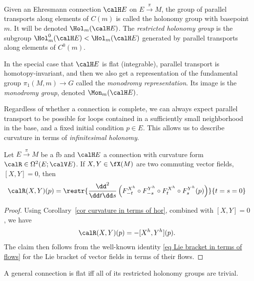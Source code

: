 \begin{defn}
    Given an Ehresmann connection $\calH E$ on $E\overset{\pi}{\to}M$, the group of parallel transports along elements of $C(m)$ is called the holonomy group  with basepoint $m$. It will be denoted $\Hol_m(\calH E)$. The \emph{restricted holonomy group} is the subgroup $\Hol^0_m(\calH E)<\Hol_m(\calH E)$ generated by parallel transports along elements of $C^0(m)$.
\end{defn}

\begin{defn}
    In the special case that $\calH E$ is flat (integrable), parallel transport is homotopy-invariant, and then we also get a representation of the fundamental group $\pi_1(M,m)\to G$ called the \emph{monodromy representation}. Its image is the \emph{monodromy group}, denoted $\Mon_m(\calH E)$.
\end{defn}

Regardless of whether a connection is complete, we can always expect parallel transport to be possible for loops contained in a sufficiently small neighborhood in the base, and a fixed initial condition $p\in E$. This allows us to describe curvature in terms of \emph{infinitesimal holonomy}.

\begin{prop}
    Let $E\overset{\pi}{\to}M$ be a \gls{fb} and $\calH E$ a connection with curvature form $\calR\in\Omega^2(E;\calV E)$. If $X,Y\in\fX(M)$ are two commuting vector fields, $[X,Y]=0$, then 
    \[\calR(X,Y)(p)=\restr{\frac{\dd^2}{\dd t\dd s}\left(
    F^{X^h}_{-t}\circ F^{Y^h}_{-s}\circ F^{X^h}_t\circ F^{Y^h}_s(p)
    \right)}{t=s=0}\]
\end{prop}
\begin{proof}
    Using Corollary~\ref{cor curvature in terms of hor}, combined with $[X,Y]=0$, we have 
    \[\calR(X,Y)(p)=-[X^h,Y^h](p).\] 
    The claim then follows from the well-known identity \eqref{eq Lie bracket in terms of flows} for the Lie bracket of vector fields in terms of their flows.
\end{proof}
\begin{cor}
    A general connection is flat iff all of its restricted holonomy groups are trivial.
\end{cor}

